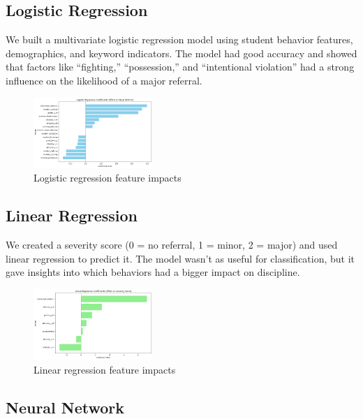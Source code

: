 \documentclass[letterpaper]{article}
\begin{document}
\subsection*{Logistic Regression}

We built a multivariate logistic regression model using student behavior 
features, demographics, and keyword indicators. The model had good 
accuracy and showed that factors like ``fighting,'' ``possession,'' 
and ``intentional violation'' had a strong influence on the likelihood 
of a major referral.

\begin{figure}[htbp]
    \centering
    \includegraphics[width=0.4\textwidth]{4220_figures/logistic.png}
    \caption{Logistic regression feature impacts}
    \label{fig:logistic}
\end{figure}

\subsection*{Linear Regression}

We created a severity score (0 = no referral, 1 = minor, 2 = major) 
and used linear regression to predict it. The model wasn't as useful 
for classification, but it gave insights into which behaviors had a 
bigger impact on discipline.

\begin{figure}[htbp]
    \centering
    \includegraphics[width=0.4\textwidth]{4220_figures/linear.png}
    \caption{Linear regression feature impacts}
    \label{fig:linear}
\end{figure}

\subsection*{Neural Network}
\end{document}
